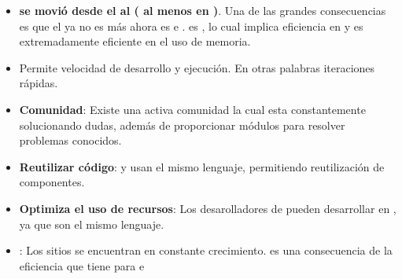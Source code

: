 \begin{itemize}
	\item \textbf{\frontEndAS se movió desde el \serverSide al \clientSide( al menos en \mobile )}. Una de las grandes consecuencias es que el \serverSide ya no es más \cpuBoundPC ahora es \memoryBoundPC e \ioBoundPC. \nodejsNAME es \eventdrivenPL, lo cual implica eficiencia en \ioBoundPC y es extremadamente eficiente en el uso de memoria.
	\item Permite velocidad de desarrollo y ejecución. En otras palabras iteraciones rápidas.
	\item \textbf{Comunidad}: Existe una activa comunidad la cual esta constantemente solucionando dudas, además de proporcionar módulos para resolver problemas conocidos.
	\item \textbf{Reutilizar código}: \serverSide y \clientSide usan el mismo lenguaje, permitiendo reutilización de componentes.
	\item \textbf{Optimiza el uso de recursos}: Los desarolladores de \clientSide pueden desarrollar en \serverSide, ya que son el mismo lenguaje.
	\item \textbf{\scalabilityQA}: Los sitios \web se encuentran en constante crecimiento. \scalabilityQA es una consecuencia de la eficiencia que tiene \nodejsNAME para \memoryBoundPC e \ioBoundPC
\end{itemize}

